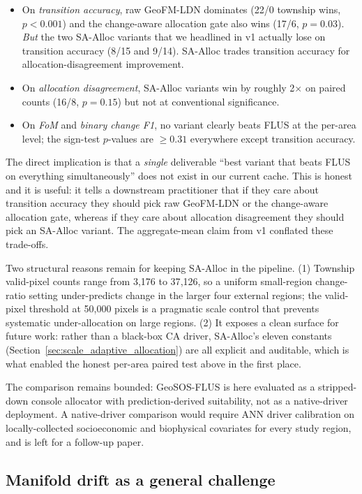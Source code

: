 \documentclass{article}
\begin{document}
\begin{itemize}
\item On \emph{transition accuracy}, raw GeoFM-LDN dominates (22/0 township wins, $p<0.001$) and the change-aware allocation gate also wins (17/6, $p=0.03$). \emph{But} the two SA-Alloc variants that we headlined in v1 actually lose on transition accuracy (8/15 and 9/14). SA-Alloc trades transition accuracy for allocation-disagreement improvement.
\item On \emph{allocation disagreement}, SA-Alloc variants win by roughly 2$\times$ on paired counts (16/8, $p=0.15$) but not at conventional significance.
\item On \emph{FoM} and \emph{binary change F1}, no variant clearly beats FLUS at the per-area level; the sign-test $p$-values are $\geq 0.31$ everywhere except transition accuracy.
\end{itemize}

The direct implication is that a \emph{single} deliverable ``best variant that beats FLUS on everything simultaneously'' does not exist in our current cache. This is honest and it is useful: it tells a downstream practitioner that if they care about transition accuracy they should pick raw GeoFM-LDN or the change-aware allocation gate, whereas if they care about allocation disagreement they should pick an SA-Alloc variant. The aggregate-mean claim from v1 conflated these trade-offs.

Two structural reasons remain for keeping SA-Alloc in the pipeline. (1) Township valid-pixel counts range from 3{,}176 to 37{,}126, so a uniform small-region change-ratio setting under-predicts change in the larger four external regions; the valid-pixel threshold at 50{,}000 pixels is a pragmatic scale control that prevents systematic under-allocation on large regions. (2) It exposes a clean surface for future work: rather than a black-box CA driver, SA-Alloc's eleven constants (Section~\ref{sec:scale_adaptive_allocation}) are all explicit and auditable, which is what enabled the honest per-area paired test above in the first place.

The comparison remains bounded: GeoSOS-FLUS is here evaluated as a stripped-down console allocator with prediction-derived suitability, not as a native-driver deployment. A native-driver comparison would require ANN driver calibration on locally-collected socioeconomic and biophysical covariates for every study region, and is left for a follow-up paper.

\subsection{Manifold drift as a general challenge}
\end{document}
